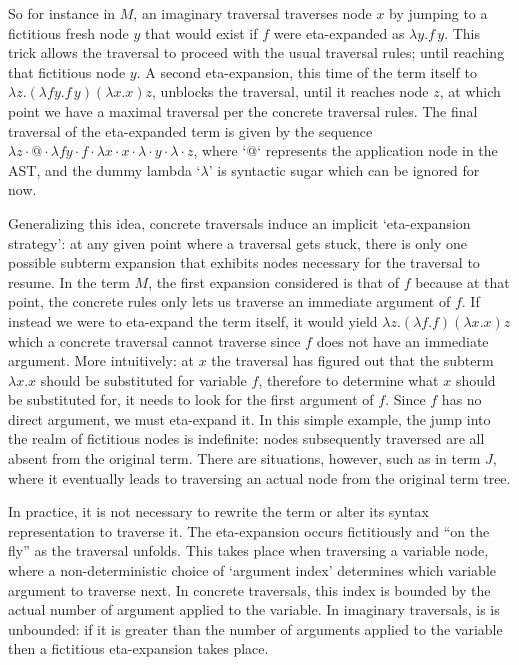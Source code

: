 \documentclass{elsarticle}
\theoremstyle{plain}
\theoremstyle{definition}
\theoremstyle{remark}
\begin{document}
So for instance in $M$, an imaginary traversal traverses node $x$ by jumping to a fictitious fresh node $y$ that would exist if $f$ were eta-expanded
as $\lambda y.f\, y$. This trick allows the traversal to proceed with the usual traversal rules; until reaching that fictitious node $y$.
A second eta-expansion, this time of the term itself to
$\lambda z. (\lambda f y.f\, y)(\lambda x.x) z$,
unblocks the traversal, until it reaches node $z$, at which point we have a maximal traversal per the concrete traversal rules. The final traversal of the eta-expanded term is given by the sequence $\lambda z \cdot @ \cdot \lambda f y \cdot f \cdot \lambda x \cdot x \cdot \lambda \cdot y \cdot \lambda \cdot z$, where `@` represents the application node in the AST, and the dummy lambda `$\lambda$' is syntactic sugar which can be ignored for now.

Generalizing this idea, concrete traversals induce an implicit `eta-expansion strategy': at any given point where a traversal gets stuck, there is only one possible subterm expansion that exhibits nodes necessary for the traversal to resume. In the term $M$, the first expansion considered is that of $f$ because at that point, the concrete rules only lets us
traverse an immediate argument of $f$. If instead we were to eta-expand the term itself, it would yield $\lambda z. (\lambda f .f)(\lambda x.x) z$
which a concrete traversal cannot traverse since $f$ does not have an immediate argument. More intuitively: at $x$ the traversal has figured out that the subterm $\lambda x.x$ should be substituted for variable $f$, therefore to determine what $x$ should be substituted for, it needs to look for the first argument of $f$. Since $f$ has no direct argument, we must eta-expand it. In this simple example, the jump into the realm of fictitious nodes is indefinite: nodes subsequently traversed are all absent from the original term. There are situations, however, such as in term $J$, where it eventually leads to traversing an actual node from the original term tree.

In practice, it is not necessary to rewrite the term or alter its syntax representation to traverse it.
The eta-expansion occurs fictitiously and ``on the fly'' as the traversal unfolds.
This takes place when traversing a variable node, where a non-deterministic choice of `argument index' determines which variable argument to traverse next. In concrete traversals, this index is bounded by the actual number of argument applied to the variable. In imaginary traversals, is is unbounded: if it is greater than the number of arguments applied to the variable then a fictitious eta-expansion takes place.
\end{document}
